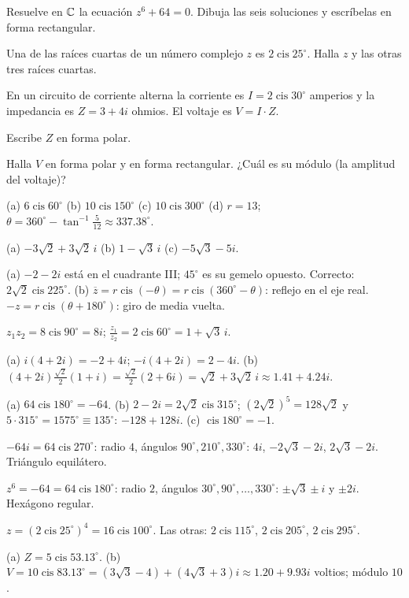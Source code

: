 \documentclass[11pt,a4paper]{article}
\newcommand{\cis}{\operatorname{cis}}
\begin{document}
\begin{ejercicios}
\item Resuelve en $\mathbb{C}$ la ecuación $z^6+64=0$. Dibuja las seis soluciones y escríbelas en forma rectangular.
\item Una de las raíces cuartas de un número complejo $z$ es $2\cis25^\circ$. Halla $z$ y las otras tres raíces cuartas.
\item En un circuito de corriente alterna la corriente es $I=2\cis30^\circ$ amperios y la impedancia es $Z=3+4i$ ohmios.
  El voltaje es $V=I\cdot Z$.
  \begin{ejercicios}
  \item Escribe $Z$ en forma polar.
  \item Halla $V$ en forma polar y en forma rectangular. ¿Cuál es su módulo (la amplitud del voltaje)?
  \end{ejercicios}
\end{ejercicios}

\respuestas
\begin{respuestascortas}
\begin{soluciones}
\item (a) $6\cis60^\circ$ (b) $10\cis150^\circ$ (c) $10\cis300^\circ$ (d) $r=13$; $\theta=360^\circ-\tan^{-1}\tfrac{5}{12}\approx337.38^\circ$.
\item (a) $-3\sqrt2+3\sqrt2\,i$ (b) $1-\sqrt3\,i$ (c) $-5\sqrt3-5i$.
\item (a) $-2-2i$ está en el cuadrante III; $45^\circ$ es su gemelo opuesto. Correcto: $2\sqrt2\cis225^\circ$.
  (b) $\overline z=r\cis(-\theta)=r\cis(360^\circ-\theta)$: reflejo en el eje real. $-z=r\cis(\theta+180^\circ)$: giro de media vuelta.
\item $z_1z_2=8\cis90^\circ=8i$; $\tfrac{z_1}{z_2}=2\cis60^\circ=1+\sqrt3\,i$.
\item (a) $i(4+2i)=-2+4i$; $-i(4+2i)=2-4i$. (b) $(4+2i)\tfrac{\sqrt2}{2}(1+i)=\tfrac{\sqrt2}{2}(2+6i)=\sqrt2+3\sqrt2\,i\approx1.41+4.24i$.
\item (a) $64\cis180^\circ=-64$. (b) $2-2i=2\sqrt2\cis315^\circ$; $(2\sqrt2)^5=128\sqrt2$ y $5\cdot315^\circ=1575^\circ\equiv135^\circ$: $-128+128i$.
  (c) $\cis180^\circ=-1$.
\item $-64i=64\cis270^\circ$: radio $4$, ángulos $90^\circ,210^\circ,330^\circ$: $4i$, $-2\sqrt3-2i$, $2\sqrt3-2i$. Triángulo equilátero.
\item $z^6=-64=64\cis180^\circ$: radio $2$, ángulos $30^\circ,90^\circ,\dots,330^\circ$: $\pm\sqrt3\pm i$ y $\pm2i$. Hexágono regular.
\item $z=(2\cis25^\circ)^4=16\cis100^\circ$. Las otras: $2\cis115^\circ$, $2\cis205^\circ$, $2\cis295^\circ$.
\item (a) $Z=5\cis53.13^\circ$. (b) $V=10\cis83.13^\circ=(3\sqrt3-4)+(4\sqrt3+3)i\approx1.20+9.93i$ voltios; módulo $10$.
\end{soluciones}
\end{respuestascortas}
\end{document}
